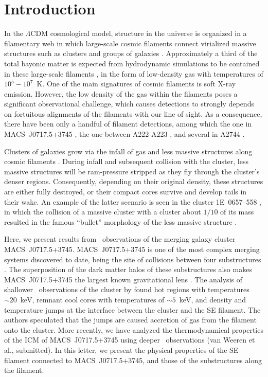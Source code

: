 \section{Introduction}

In the $\Lambda$CDM cosmological model, structure in the universe is organized in a filamentary web in which large-scale cosmic filaments connect virialized massive structures such as clusters and groups of galaxies \citep[e.g., ][]{Einasto1994}. Approximately a third of the total bayonic matter is expected from hydrodynamic simulations to be contained in these large-scale filaments \citep[e.g.][]{Dave2001}, in the form of low-density gas with temperatures of $10^5-10^7$~K. One of the main signatures of cosmic filaments is soft X-ray emission. However, the low density of the gas within the filaments poses a significant observational challenge, which causes detections to strongly depends on fortuitous alignments of the filaments with our line of sight. As a consequence, there have been only a handful of filament detections, among which the one in MACS~J0717.5+3745 \citep{Ebeling2004}, the one between A222-A223 \citep{Dietrich2005, Werner2008}, and several in A2744 \citep{Eckert2015}.

Clusters of galaxies grow via the infall of gas and less massive structures along cosmic filaments \citep[e.g.,][]{Springel2006}. During infall and subsequent collision with the cluster, less massive structures will be ram-pressure stripped as they fly through the cluster's denser regions. Consequently, depending on their original density, these structures are either fully destroyed, or their compact cores survive and develop tails in their wake. An example of the latter scenario is seen in the cluster 1E~0657--558 \citep{Elvis1992}, in which the collision of a massive cluster with a cluster about $1/10$ of its mass \citep{Springel2007, Mastropietro2008} resulted in the famous ``bullet'' morphology of the less massive structure \citep{Markevitch2002}.

Here, we present results from \chandra\ observations of the merging galaxy cluster MACS~J0717.5+3745. MACS~J0717.5+3745 \citep[$z=0.546$;][]{Ebeling2001, Ebeling2007} is one of the most complex merging systems discovered to date, being the site of collisions between four substructures \citep{Ma2009, Medezinski2013}. The superposition of the dark matter halos of these substructures also makes MACS~J0717.5+3745 the largest known gravitational lens \citep{Zitrin2009, Medezinski2013}. The analysis of shallower \chandra\ observations of the cluster by \citet{Ma2009} found hot regions with temperatures $\sim 20$~keV, remnant cool cores with temperatures of $\sim 5$~keV, and density and temperature jumps at the interface between the cluster and the SE filament. The authors speculated that the jumps are caused accretion of gas from the filament onto the cluster. More recently, we have analyzed the thermodynamical properties of the ICM of MACS~J0717.5+3745 using deeper \chandra\ observations (van Weeren et al., submitted). In this letter, we present the physical properties of the SE filament connected to MACS~J0717.5+3745, and those of the substructures along the filament.


